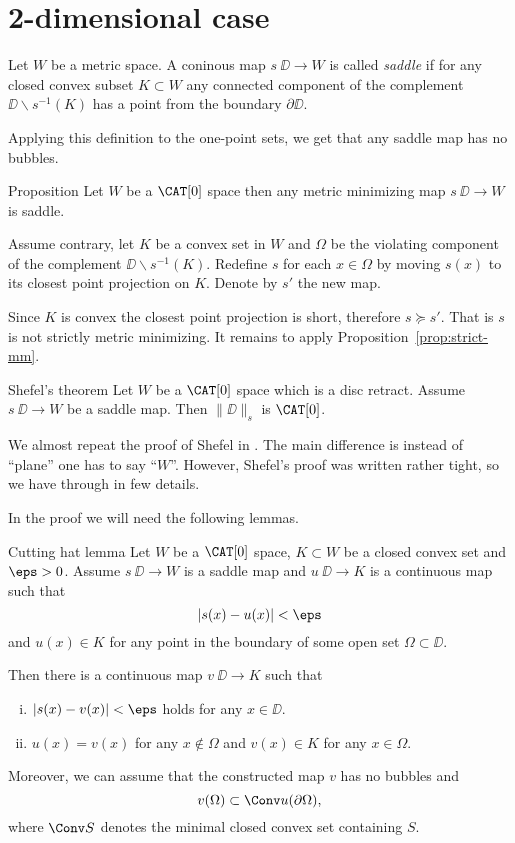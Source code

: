 



\section{2-dimensional case}

Let $W$ be a metric space.
A coninous map $s\:\DD\to W$ is called \emph{saddle} if for any closed convex subset $K\subset W$ 
any connected component of the complement $\DD\backslash s^{-1}(K)$
has a point from the boundary $\partial \DD$.

Applying this definition to the one-point sets,
we get that any saddle map has no bubbles.


\begin{thm}{Proposition}
Let $W$ be a $\CAT[0]$ space then any metric minimizing map $s\:\DD\to W$ is saddle.
\end{thm}

Assume contrary, let $K$ be a convex set in $W$
and $\Omega$ be the violating component of the complement $\DD\backslash s^{-1}(K)$.
Redefine $s$ for each $x\in\Omega$ by moving 
$s(x)$ to its closest point projection on $K$.
Denote by $s'$ the new map.

Since $K$ is convex the closest point projection is short,
therefore $s\succcurlyeq s'$.
That is $s$ is not strictly metric minimizing.
It remains to apply Proposition~\ref{prop:strict-mm}.
\qeds


\begin{thm}{Shefel's theorem}\label{thm:shefel-2D}
Let $W$ be a $\CAT[0]$ space which is a disc retract.
Assume $s\:\DD\to W$ be a saddle map. 
Then $\|\DD\|_s$ is $\CAT[0]$.
\end{thm}

We almost repeat the proof of Shefel in \cite{shefel-2D}.
The main difference is instead of ``plane'' one has to say ``$W$''.
However, Shefel's proof was written rather tight, so we have through in few details.

In the proof we will need the following lemmas.

\begin{thm}{Cutting hat lemma}\label{lem:cutting-hat}
Let 
$W$ be a $\CAT[0]$ space, 
$K\subset W$ be a closed convex set 
and $\eps>0$.
Assume $s\:\DD\to W$ is a saddle map 
and $u\:\DD\to K$ is a continuous map such that 
\[|s(x)-u(x)|<\eps\]
and $u(x)\in K$ for any point in the boundary of some open set $\Omega\subset \DD$.

Then there is a continuous map $v\:\DD\to K$ such that 
\begin{enumerate}[(i)]
\item $|s(x)-v(x)|<\eps$ holds for any $x\in\DD$.
\item $u(x)=v(x)$ for any $x\notin\Omega$ and
$v(x)\in K$ for any $x\in\Omega$.
\end{enumerate}
Moreover, we can assume that the constructed map $v$ has no bubbles
and 
\[v(\Omega)\subset \Conv u(\partial\Omega),\]
where $\Conv S$ denotes the minimal closed convex set containing $S$.
\end{thm}

